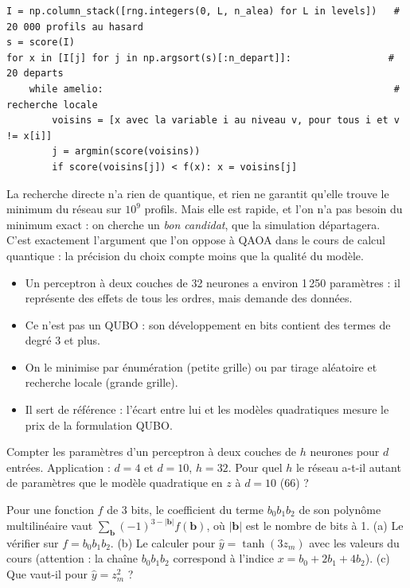 \begin{codebox}
\begin{lstlisting}
I = np.column_stack([rng.integers(0, L, n_alea) for L in levels])   # 20 000 profils au hasard
s = score(I)
for x in [I[j] for j in np.argsort(s)[:n_depart]]:                 # 20 departs
    while amelio:                                                   # recherche locale
        voisins = [x avec la variable i au niveau v, pour tous i et v != x[i]]
        j = argmin(score(voisins))
        if score(voisins[j]) < f(x): x = voisins[j]
\end{lstlisting}
\end{codebox}

\begin{projet}
La recherche directe n'a rien de quantique, et rien ne garantit qu'elle trouve le minimum du réseau sur $10^9$ profils. Mais elle est rapide, et l'on n'a pas besoin du minimum exact : on cherche un \emph{bon candidat}, que la simulation départagera. C'est exactement l'argument que l'on oppose à QAOA dans le cours de calcul quantique : la précision du choix compte moins que la qualité du modèle.
\end{projet}

\begin{resultat}
\begin{itemize}
\item Un perceptron à deux couches de 32 neurones a environ 1\,250 paramètres : il représente des effets de tous les ordres, mais demande des données.
\item Ce n'est pas un QUBO : son développement en bits contient des termes de degré 3 et plus.
\item On le minimise par énumération (petite grille) ou par tirage aléatoire et recherche locale (grande grille).
\item Il sert de référence : l'écart entre lui et les modèles quadratiques mesure le prix de la formulation QUBO.
\end{itemize}
\end{resultat}

\exercices
\begin{exercice}\label{ex:mlp-param}
Compter les paramètres d'un perceptron à deux couches de $h$ neurones pour $d$ entrées. Application : $d=4$ et $d=10$, $h=32$. Pour quel $h$ le réseau a-t-il autant de paramètres que le modèle quadratique en $z$ à $d=10$ (66) ?
\end{exercice}
\begin{exercice}\label{ex:cubique}
Pour une fonction $f$ de 3 bits, le coefficient du terme $b_0b_1b_2$ de son polynôme multilinéaire vaut $\sum_{\mathbf b}(-1)^{3-|\mathbf b|}f(\mathbf b)$, où $|\mathbf b|$ est le nombre de bits à 1. (a) Le vérifier sur $f=b_0b_1b_2$. (b) Le calculer pour $\hat y=\tanh(3z_m)$ avec les valeurs du cours (attention : la chaîne $b_0b_1b_2$ correspond à l'indice $x=b_0+2b_1+4b_2$). (c) Que vaut-il pour $\hat y=z_m^2$ ?
\end{exercice}

